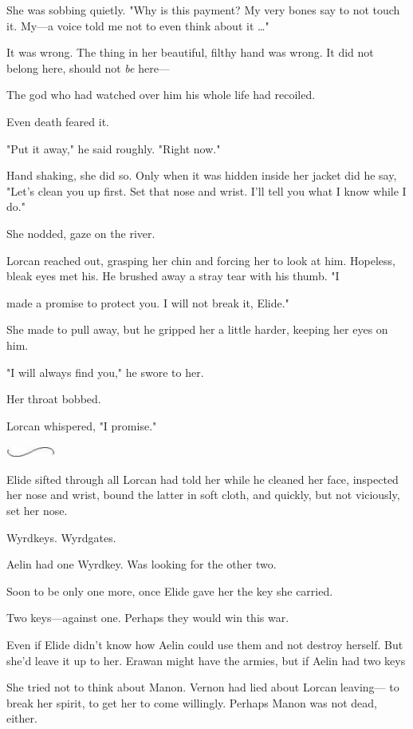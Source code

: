 She was sobbing quietly. "Why is this payment? My very bones say to not touch it. My---a voice told me not to even think about it \ldots"

It was wrong. The thing in her beautiful, filthy hand was wrong. It did not belong here, should not \emph{be} here---

The god who had watched over him his whole life had recoiled.

Even death feared it.

"Put it away," he said roughly. "Right now."

Hand shaking, she did so. Only when it was hidden inside her jacket did he say, "Let's clean you up first. Set that nose and wrist. I'll tell you what I know while I do."

She nodded, gaze on the river.

Lorcan reached out, grasping her chin and forcing her to look at him. Hopeless, bleak eyes met his. He brushed away a stray tear with his thumb. "I

made a promise to protect you. I will not break it, Elide."

She made to pull away, but he gripped her a little harder, keeping her eyes on him.

"I will always find you," he swore to her.

Her throat bobbed.

Lorcan whispered, "I promise."

\includegraphics[width=0.65in,height=0.13in]{images/seperator}

Elide sifted through all Lorcan had told her while he cleaned her face, inspected her nose and wrist, bound the latter in soft cloth, and quickly, but not viciously, set her nose.

Wyrdkeys. Wyrdgates.

Aelin had one Wyrdkey. Was looking for the other two.

Soon to be only one more, once Elide gave her the key she carried.

Two keys---against one. Perhaps they would win this war.

Even if Elide didn't know how Aelin could use them and not destroy herself. But  she'd leave it up to her. Erawan might have the armies, but if Aelin had two keys 

She tried not to think about Manon. Vernon had lied about Lorcan leaving--- to break her spirit, to get her to come willingly. Perhaps Manon was not dead, either.

